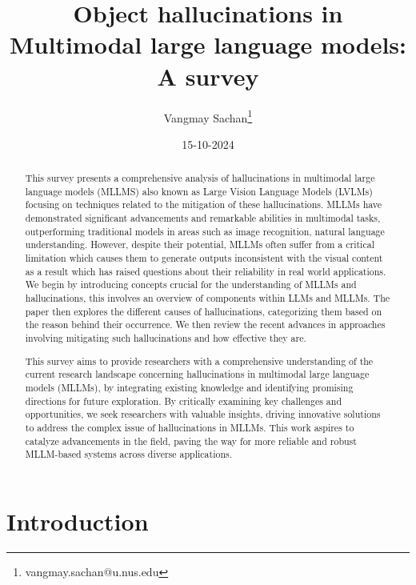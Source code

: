 \documentclass[twocolumn, 9pt]{extarticle}
\begin{document}
\title{Object hallucinations in Multimodal large language models: A survey}

\author[1, 2]{Vangmay Sachan\thanks{vangmay.sachan@u.nus.edu}}


\setcounter{Maxaffil}{0}
\renewcommand\Affilfont{\itshape\small}

\date{15-10-2024}  
\maketitle


\begin{abstract}
This survey presents a comprehensive analysis of hallucinations in multimodal large language models (MLLMS) also known as Large Vision Language Models (LVLMs) focusing on techniques related to the mitigation of these hallucinations. MLLMs have demonstrated significant advancements and remarkable abilities in multimodal tasks, outperforming traditional models in areas such as image recognition, natural language understanding. However, despite their potential, MLLMs often suffer from a critical limitation which causes them to generate outputs inconsistent with the visual content as a result which has raised questions about their reliability in real world applications. We begin by introducing concepts crucial for the understanding of MLLMs and hallucinations, this involves an overview of components within LLMs and MLLMs. The paper then explores the different causes of hallucinations, categorizing them based on the reason behind their occurrence. We then review the recent advances in approaches involving mitigating such hallucinations and how effective they are. 

This survey aims to provide researchers with a comprehensive understanding of the current research landscape concerning hallucinations in multimodal large language models (MLLMs), by integrating existing knowledge and identifying promising directions for future exploration. By critically examining key challenges and opportunities, we seek researchers with valuable insights, driving innovative solutions to address the complex issue of hallucinations in MLLMs. This work aspires to catalyze advancements in the field, paving the way for more reliable and robust MLLM-based systems across diverse applications.
\end{abstract}

\section{Introduction}
\end{document}
